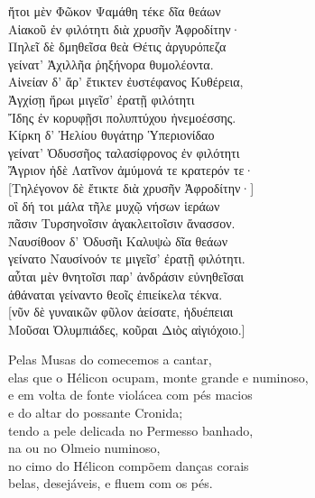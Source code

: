 \begin{pages}
\begin{Leftside}
\quad{}ἤτοι μὲν Φῶκον Ψαμάθη τέκε δῖα θεάων\\
Αἰακοῦ ἐν φιλότητι διὰ χρυσῆν Ἀφροδίτην·  \\
Πηλεῖ δὲ δμηθεῖσα θεὰ Θέτις ἀργυρόπεζα\\
γείνατ' Ἀχιλλῆα ῥηξήνορα θυμολέοντα.\\
Αἰνείαν δ' ἄρ' ἔτικτεν ἐυστέφανος Κυθέρεια,\\

\quad{}Ἀγχίσῃ ἥρωι μιγεῖσ' ἐρατῇ φιλότητι \\
Ἴδης ἐν κορυφῇσι πολυπτύχου ἠνεμοέσσης. \\
Κίρκη δ' Ἠελίου θυγάτηρ Ὑπεριονίδαο\\

\quad{}γείνατ' Ὀδυσσῆος ταλασίφρονος ἐν φιλότητι\\
Ἄγριον ἠδὲ Λατῖνον ἀμύμονά τε κρατερόν τε· \\
{[}Τηλέγονον δὲ ἔτικτε διὰ χρυσῆν Ἀφροδίτην·{]}\\
οἳ δή τοι μάλα τῆλε μυχῷ νήσων ἱεράων \\ %
πᾶσιν Τυρσηνοῖσιν ἀγακλειτοῖσιν ἄνασσον.\\

\quad{}Ναυσίθοον δ' Ὀδυσῆι Καλυψὼ δῖα θεάων\\
γείνατο Ναυσίνοόν τε μιγεῖσ' ἐρατῇ φιλότητι. \\

\quad{}αὗται μὲν θνητοῖσι παρ' ἀνδράσιν εὐνηθεῖσαι\\
ἀθάναται γείναντο θεοῖς ἐπιείκελα τέκνα. \\
{[}νῦν δὲ γυναικῶν φῦλον ἀείσατε, ἡδυέπειαι\\
Μοῦσαι Ὀλυμπιάδες, κοῦραι Διὸς αἰγιόχοιο.{]}

            \pend
         \endnumbering
    \end{Leftside}
    \begin{Rightside}
        \beginnumbering
            \pstart
\noindent{}Pelas Musas do  comecemos a cantar, \\
elas que o Hélicon ocupam, monte grande e numinoso,\\
e em volta de fonte violácea com pés macios\\
 e do altar do possante Cronida;\\
tendo a pele delicada no Permesso banhado,\\
na  ou no Olmeio numinoso,\\
no cimo do Hélicon compõem danças corais\\
belas, desejáveis, e fluem com os pés.\\


\end{Rightside}
\end{pages}
